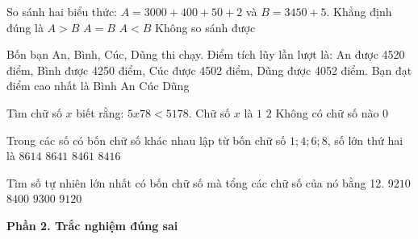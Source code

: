 \begin{ex} %
So sánh hai biểu thức: $A = 3000 + 400 + 50 + 2$ và $B = 3450 + 5$. Khẳng định đúng là
\choice
{$A > B$}
{$A = B$}
{\True $A < B$}
{Không so sánh được}
\end{ex}

\begin{ex} %
Bốn bạn An, Bình, Cúc, Dũng thi chạy. Điểm tích lũy lần lượt là: An được 4520 điểm, Bình được 4250 điểm, Cúc được 4502 điểm, Dũng được 4052 điểm. Bạn đạt điểm cao nhất là
\choice
{Bình}
{\True An}
{Cúc}
{Dũng}
\end{ex}

\begin{ex} %
Tìm chữ số $x$ biết rằng: $5x78 < 5178$. Chữ số $x$ là
\choice
{$1$}
{$2$}
{Không có chữ số nào}
{\True $0$}
\end{ex}

\begin{ex} %
Trong các số có bốn chữ số khác nhau lập từ bốn chữ số $1; 4; 6; 8$, số lớn thứ hai là
\choice
{\True $8614$}
{$8641$}
{$8461$}
{$8416$}
\end{ex}

\begin{ex} %
Tìm số tự nhiên lớn nhất có bốn chữ số mà tổng các chữ số của nó bằng 12.
\choice
{$9210$}
{$8400$}
{\True $9300$}
{$9120$}
\end{ex}

\textbf{Phần 2. Trắc nghiệm đúng sai}

